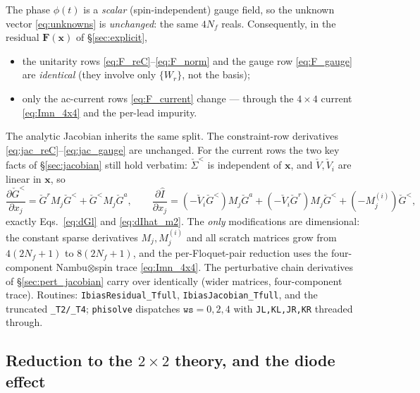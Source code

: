 \documentclass[11pt,a4paper]{article}
\newcommand{\Wm}{W}
\begin{document}
The phase $\phi(t)$ is a \emph{scalar} (spin-independent) gauge field, so the
unknown vector \eqref{eq:unknowns} is \emph{unchanged}: the same $4N_f$ reals.
Consequently, in the residual $\mathbf F(\mathbf x)$ of \S\ref{sec:explicit},
\begin{itemize}
  \item the unitarity rows \eqref{eq:F_reC}--\eqref{eq:F_norm} and the gauge row
        \eqref{eq:F_gauge} are \emph{identical} (they involve only $\{\Wm_r\}$,
        not the basis);
  \item only the ac-current rows \eqref{eq:F_current} change --- through the
        $4\times4$ current \eqref{eq:Imn_4x4} and the per-lead impurity.
\end{itemize}
The analytic Jacobian inherits the same split.  The constraint-row derivatives
\eqref{eq:jac_reC}--\eqref{eq:jac_gauge} are unchanged.  For the current rows the
two key facts of \S\ref{sec:jacobian} still hold verbatim: $\check\Sigma^<$ is
independent of $\mathbf x$, and $\check V,\check V_i$ are linear in $\mathbf x$,
so
\begin{equation}
  \frac{\partial\check G^<}{\partial x_j}=\check G^r M_j\check G^<+\check G^< M_j\check G^a,
  \qquad
  \frac{\partial\hat I}{\partial x_j}
  =(-\check V_i\check G^<)M_j\check G^a+(-\check V_i\check G^r)M_j\check G^<+(-M^{(i)}_j)\check G^<,
  \label{eq:dG_4x4}
\end{equation}
exactly Eqs.~\eqref{eq:dGl} and \eqref{eq:dIhat_m2}.  The \emph{only}
modifications are dimensional: the constant sparse derivatives $M_j,M^{(i)}_j$ and
all scratch matrices grow from $4(2N_f+1)$ to $8(2N_f+1)$, and the
per-Floquet-pair reduction uses the four-component Nambu$\otimes$spin trace
\eqref{eq:Imn_4x4}.  The perturbative chain derivatives of
\S\ref{sec:pert_jacobian} carry over identically (wider matrices, four-component
trace).  Routines: \texttt{IbiasResidual\_Tfull}, \texttt{IbiasJacobian\_Tfull},
and the truncated \texttt{\_T2/\_T4}; \texttt{phisolve} dispatches
$\texttt{ws}=0,2,4$ with \texttt{JL,KL,JR,KR} threaded through.

\subsection{Reduction to the \texorpdfstring{$2\times2$}{2x2} theory, and the diode effect}
\label{sec:ysr_check}
\end{document}
